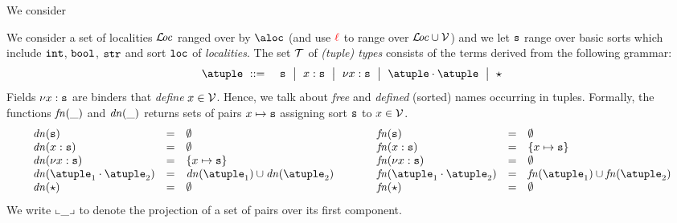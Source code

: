 %

We consider 

We consider a set of localities $\locset$ ranged over by $\aloc$ (and
use $\alocvar$ to range over $\locset\cup\varset$) and we let $\asort$
range over basic sorts which include $\asort[int]$, $\asort[bool]$,
$\asort[str]$ and sort $\asort[loc]$ of \emph{localities}.
%
The set $\tupleset$ of \emph{(tuple) types} consists of the terms
derived from the following grammar:
\begin{eqnarray*}
  \atuple & \bnfdef & \asort \bnfmid
                      x : \asort \bnfmid
                      \nu x : \asort  \bnfmid
                      \atuple \cdot \atuple \bnfmid
                      \wildcard
\end{eqnarray*}
Fields $\nu x : \asort$ are binders that \emph{define}
$x \in \varset$.
%
Hence, we talk about \emph{free} and \emph{defined} (sorted) names occurring in
tuples.
%
%
Formally, the functions $\fn{\_}$ and $\dn{\_}$ returns sets of pairs
$x \mapsto \asort$ assigning sort $\asort$ to $x \in \varset$.
\[
\begin{array}{l@{\hspace{1cm}}l}
\begin{array}{lcl}
  \dn\asort & = & \emptyset
  \\
  \dn{x : \asort} & = & \emptyset
  \\
  \dn{\nu x : \asort} & = & \{x \mapsto \asort \}
  \\
  \dn{\atuple_1 \cdot \atuple_2} & = & \dn{\atuple_1} \cup \dn{\atuple_2}
  \\
  \dn{\wildcard} & = & \emptyset
\end{array}
&
\begin{array}{lcl}
  \fn\asort & = & \emptyset
  \\
  \fn{x : \asort} & = &  \{x \mapsto \asort\}
  \\
  \fn{\nu x : \asort} & = & \emptyset
  \\
  \fn{\atuple_1 \cdot \atuple_2} & = & \fn{\atuple_1} \cup \fn{\atuple_2}
  \\
  \fn{\wildcard} & = & \emptyset
\end{array}
\end{array}
\]
We write $\supp{\_}$ to denote the projection of a set of pairs over its first component. 

